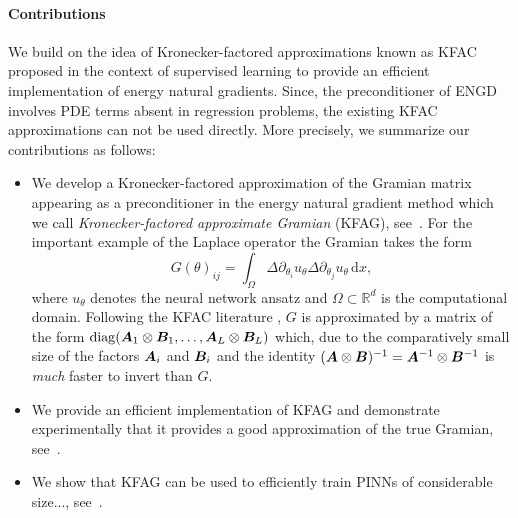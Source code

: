\paragraph{Contributions} 
We build on the idea of Kronecker-factored approximations known as KFAC proposed in the context of supervised learning to provide an efficient implementation of energy natural gradients. 
Since, the preconditioner of ENGD involves PDE terms absent in regression problems, the existing KFAC approximations can not be used directly. 
More precisely, we summarize our contributions as follows: 
\begin{itemize}
    \item We develop a Kronecker-factored approximation of the Gramian matrix appearing as a preconditioner in the energy natural gradient method which we call \emph{Kronecker-factored approximate Gramian} (KFAG), see~. For the important example of the Laplace operator the Gramian takes the form
    \begin{equation*}
        G(\theta)_{ij}
        =
        \int_\Omega \Delta \partial_{\theta_i} u_\theta \Delta \partial_{\theta_j} u_\theta \, \mathrm dx, 
    \end{equation*}
    where $u_\theta$ denotes the neural network ansatz and $\Omega\subset\mathbb R^d$ is the computational domain. Following the KFAC literature \cite{martens2015optimizing}, $G$ is approximated by a matrix of the form $\operatorname{diag}({\bm{A}}_1\otimes{\bm{B}}_1, \dots, {\bm{A}}_L\otimes{\bm{B}}_L)$ which, due to the comparatively small size of the factors ${\bm{A}}_i$ and ${\bm{B}}_i$ and the identity $({\bm{A}} \otimes {\bm{B}})^{-1} = {\bm{A}}^{-1} \otimes {\bm{B}}^{-1}$ is \emph{much} faster to invert than $G$.
    
    
    \item We provide an efficient implementation of KFAG and demonstrate experimentally that it provides a good approximation of the true Gramian, see~. 
    \item We show that KFAG can be used to efficiently train PINNs of considerable size..., see~. 
\end{itemize}

